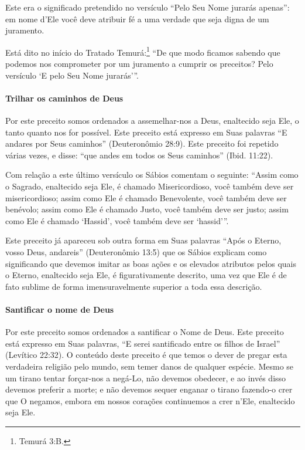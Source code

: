 Este era o significado pretendido no versículo ``Pelo Seu Nome jurarás
apenas'': em nome d'Ele você deve atribuir fé a uma verdade que seja
digna de um juramento.

Está dito no início do Tratado Temurá:\footnote{Temurá 3:B.} ``De que
modo ficamos sabendo que podemos nos comprometer por um juramento a cumprir os preceitos? Pelo versículo `E pelo Seu Nome jurarás'''.

\paragraph{Trilhar os caminhos de Deus}

Por este preceito somos ordenados a assemelhar-nos a Deus, enaltecido
seja Ele, o tanto quanto nos for possível. Este preceito está expresso
em Suas palavras ``E andares por Seus caminhos'' (Deuteronômio 28:9).
Este preceito foi repetido várias vezes, e disse: ``que andes em todos os Seus
caminhos'' (Ibid. 11:22).

Com relação a este último versículo os Sábios comentam o seguinte:
``Assim como o Sagrado, enaltecido seja Ele, é chamado Misericordioso,
você também deve ser misericordioso; assim como Ele é chamado
Benevolente, você também deve ser benévolo; assim como Ele é chamado
Justo, você também deve ser justo; assim como Ele é chamado `Hassid',
você também deve ser `hassid'''.

Este preceito já apareceu sob outra forma em Suas palavras ``Após o
Eterno, vosso Deus, andareis'' (Deuteronômio 13:5) que os Sábios
explicam como significando que devemos imitar as boas ações e os
elevados atributos pelos quais o Eterno, enaltecido seja Ele, é
figurativamente descrito, uma vez que Ele é de fato sublime de forma
imensuravelmente superior a toda essa descrição.



\paragraph{Santificar o nome de Deus}

Por este preceito somos ordenados a santificar o Nome de Deus. Este
preceito está expresso em Suas palavras, ``E serei santificado entre os
filhos de Israel'' (Levítico 22:32). O conteúdo deste preceito é que
temos o dever de pregar esta verdadeira religião pelo mundo, sem temer
danos de qualquer espécie. Mesmo se um tirano tentar forçar-nos a
negá-Lo, não devemos obedecer, e ao invés disso devemos preferir a
morte; e não devemos sequer enganar o tirano fazendo-o crer que O
negamos, embora em nossos corações continuemos a crer n'Ele, enaltecido
seja Ele.

